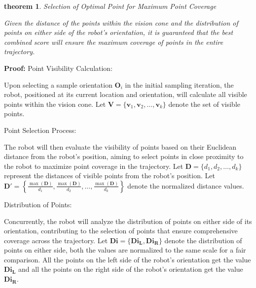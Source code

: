 \vspace*{6mm}  

\newtheorem{theorem}{theorem}[section]
\begin{theorem}
Selection of Optimal Point for Maximum Point Coverage

Given the distance of the points within the vision cone and the distribution of points on either side of the robot's orientation, it is guaranteed that the best combined score will ensure the maximum coverage of points in the entire trajectory.

\end{theorem}

\vspace*{6mm}  

\textbf{Proof:} Point Visibility Calculation:

Upon selecting a sample orientation $\mathbf{O}_i$ in the initial sampling iteration, the robot, positioned at its current location and orientation, will calculate all visible points within the vision cone. Let $\mathbf{V} = \{ \mathbf{v}_1, \mathbf{v}_2, \ldots, \mathbf{v}_k \}$ denote the set of visible points.

\vspace*{6mm}  

Point Selection Process:

The robot will then evaluate the visibility of points based on their Euclidean distance from the robot's position, aiming to select points in close proximity to the robot to maximize point coverage in the trajectory. Let $\mathbf{D} = \{ d_1, d_2, \ldots, d_k \}$ represent the distances of visible points from the robot's position. Let $\mathbf{D'} = \left\{ \frac{\max(\mathbf{D})}{d_1}, \frac{\max(\mathbf{D})}{d_2}, \ldots, \frac{\max(\mathbf{D})}{d_k} \right\}$ denote the normalized distance values.

\vspace*{6mm}  

Distribution of Points:

Concurrently, the robot will analyze the distribution of points on either side of its orientation, contributing to the selection of points that ensure comprehensive coverage across the trajectory. Let $\mathbf{Di} = \{ \mathbf{Di_L}, \mathbf{Di_R}\}$
denote the distribution of points on either side, both the values are normalized to the same scale for a fair comparison. All the points on the left side of the robot's orientation get the value $\mathbf{Di_L}$ and all the points on the right side of the robot's orientation get the value $\mathbf{Di_R}$.

